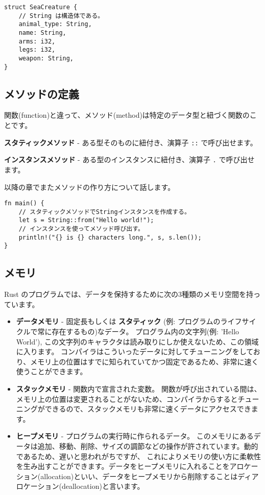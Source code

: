 \begin{verbatim}
struct SeaCreature {
    // String は構造体である。
    animal_type: String,
    name: String,
    arms: i32,
    legs: i32,
    weapon: String,
}
\end{verbatim}

\subsection{メソッドの定義}

関数(function)と違って、メソッド(method)は特定のデータ型と紐づく関数のことです。

\textbf{スタティックメソッド} - ある型そのものに紐付き、演算子
\texttt{::} で呼び出せます。

\textbf{インスタンスメソッド} - ある型のインスタンスに紐付き、演算子
\texttt{.} で呼び出せます。

以降の章でまたメソッドの作り方について話します。

\begin{verbatim}
fn main() {
    // スタティックメソッドでStringインスタンスを作成する。
    let s = String::from("Hello world!");
    // インスタンスを使ってメソッド呼び出す。
    println!("{} is {} characters long.", s, s.len());
}
\end{verbatim}

\subsection{メモリ}

Rust
のプログラムでは、データを保持するために次の3種類のメモリ空間を持っています。

\begin{itemize}
\item
  \textbf{データメモリ} - 固定長もしくは \textbf{スタティック} (例:
  プログラムのライフサイクルで常に存在するもの)なデータ。
  プログラム内の文字列(例: 'Hello World'),
  この文字列のキャラクタは読み取りにしか使えないため、この領域に入ります。
  コンパイラはこういったデータに対してチューニングをしており、メモリ上の位置はすでに知られていてかつ固定であるため、非常に速く使うことができます。
\item
  \textbf{スタックメモリ} - 関数内で宣言された変数。
  関数が呼び出されている間は、メモリ上の位置は変更されることがないため、コンパイラからするとチューニングができるので、スタックメモリも非常に速くデータにアクセスできます。
\item
  \textbf{ヒープメモリ} - プログラムの実行時に作られるデータ。
  このメモリにあるデータは追加、移動、削除、サイズの調節などの操作が許されています。動的であるため、遅いと思われがちですが、
  これによりメモリの使い方に柔軟性を生み出すことができます。データをヒープメモリに入れることをアロケーション(allocation)といい、データをヒープメモリから削除することはディアロケーション(deallocation)と言います。
\end{itemize}

